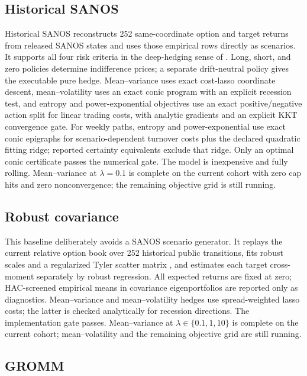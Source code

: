 \documentclass[10pt]{article}
\begin{document}
\subsection{Historical SANOS}

Historical SANOS reconstructs 252 same-coordinate option and target returns
from released SANOS states \citep{SANOS2026} and uses those empirical rows
directly as scenarios. It supports all four risk criteria in the deep-hedging
sense of \citet{BuehlerEtAl2019DeepHedging}. Long, short, and zero policies
determine indifference prices; a separate drift-neutral policy gives the
executable pure hedge. Mean--variance uses exact cost-lasso coordinate descent,
mean--volatility uses an exact conic program with an explicit recession test,
and entropy and power-exponential objectives use an exact positive/negative
action split for linear trading costs, with analytic gradients and an explicit
KKT convergence gate.
For weekly paths, entropy and power-exponential use exact conic epigraphs for
scenario-dependent turnover costs plus the declared quadratic fitting ridge;
reported certainty equivalents exclude that ridge. Only an optimal conic
certificate passes the numerical gate.
The model is inexpensive and fully rolling. Mean--variance at $\lambda=0.1$
is complete on the current cohort with zero cap hits and zero nonconvergence;
the remaining objective grid is still running.

\subsection{Robust covariance}

This baseline deliberately avoids a SANOS scenario generator. It replays the
current relative option book over 252 historical public transitions, fits
robust scales and a regularized Tyler scatter matrix
\citep{Tyler1987,ChenWieselHero2011}, and estimates each target
cross-moment separately by robust regression. All expected returns are fixed
at zero; HAC-screened empirical means in covariance eigenportfolios are
reported only as diagnostics. Mean--variance and mean--volatility hedges use
spread-weighted lasso costs; the latter is checked analytically for recession
directions. The implementation gate passes. Mean--variance at
$\lambda\in\{0.1,1,10\}$ is complete on the current cohort; mean--volatility
and the remaining objective grid are still running.

\subsection{GROMM}
\end{document}
